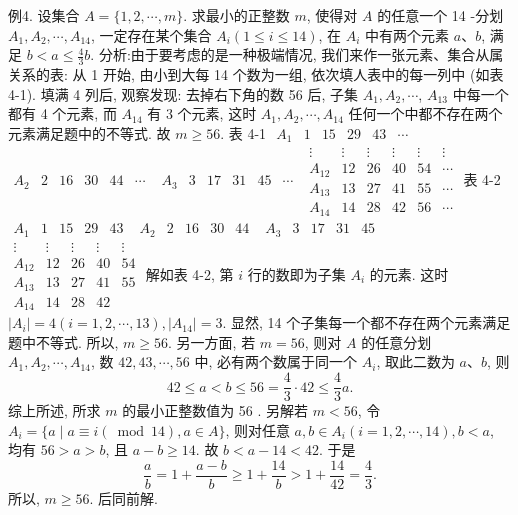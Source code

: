 例4. 设集合 $A=\{1,2, \cdots, m\}$. 求最小的正整数 $m$, 使得对 $A$ 的任意一个 14 -分划 $A_1, A_2, \cdots, A_{14}$, 一定存在某个集合 $A_i(1 \leqslant i \leqslant 14)$, 在 $A_i$ 中有两个元素 $a 、 b$, 满足 $b<a \leqslant \frac{4}{3} b$.
分析:由于要考虑的是一种极端情况, 我们来作一张元素、集合从属关系的表: 从 1 开始, 由小到大每 14 个数为一组, 依次填人表中的每一列中 (如表 4-1). 填满 4 列后, 观察发现: 去掉右下角的数 56 后, 子集 $A_1, A_2, \cdots$, $A_{13}$ 中每一个都有 4 个元素, 而 $A_{14}$ 有 3 个元素, 这时 $A_1, A_2, \cdots, A_{14}$ 任何一个中都不存在两个元素满足题中的不等式.
故 $m \geqslant 56$.
表 4-1
$\begin{array}{llllll}A_1 & 1 & 15 & 29 & 43 & \cdots\end{array}$
$\begin{array}{llllll}A_2 & 2 & 16 & 30 & 44 & \cdots\end{array}$
$\begin{array}{llllll}A_3 & 3 & 17 & 31 & 45 & \cdots\end{array}$
$\begin{array}{cccccc}\vdots & \vdots & \vdots & \vdots & \vdots & \vdots \\ A_{12} & 12 & 26 & 40 & 54 & \cdots \\ A_{13} & 13 & 27 & 41 & 55 & \cdots \\ A_{14} & 14 & 28 & 42 & 56 & \cdots\end{array}$
表 4-2
$\begin{array}{lllll}A_1 & 1 & 15 & 29 & 43\end{array}$
$\begin{array}{lllll}A_2 & 2 & 16 & 30 & 44\end{array}$
$\begin{array}{lllll}A_3 & 3 & 17 & 31 & 45\end{array}$
$\begin{array}{ccccc}\vdots & \vdots & \vdots & \vdots & \vdots \\ A_{12} & 12 & 26 & 40 & 54 \\ A_{13} & 13 & 27 & 41 & 55 \\ A_{14} & 14 & 28 & 42 & \end{array}$
解如表 4-2, 第 $i$ 行的数即为子集 $A_i$ 的元素.
这时 $\left|A_i\right|=4(i=1,2, \cdots, 13),\left|A_{14}\right|=3$. 显然, 14 个子集每一个都不存在两个元素满足题中不等式.
所以, $m \geqslant 56$.
另一方面, 若 $m=56$, 则对 $A$ 的任意分划 $A_1, A_2, \cdots, A_{14}$, 数 $42 , 43, \cdots, 56$ 中, 必有两个数属于同一个 $A_i$, 取此二数为 $a 、 b$, 则
$$
42 \leqslant a<b \leqslant 56=\frac{4}{3} \cdot 42 \leqslant \frac{4}{3} a .
$$
综上所述, 所求 $m$ 的最小正整数值为 56 .
另解若 $m<56$, 令 $A_i=\{a \mid a \equiv i(\bmod 14), a \in A\}$, 则对任意 $a, b \in A_i(i=1,2, \cdots, 14), b<a$, 均有 $56>a>b$, 且 $a-b \geqslant 14$. 故 $b<a- 14<42$. 于是
$$
\frac{a}{b}=1+\frac{a-b}{b} \geqslant 1+\frac{14}{b}>1+\frac{14}{42}=\frac{4}{3} .
$$
所以, $m \geqslant 56$.
后同前解.



